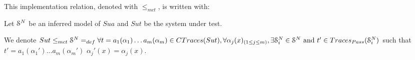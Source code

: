 %
%

This implementation relation, denoted with $\leq_{mct}$, is
written with:

\begin{definition}
	\label{impl21}
	 Let $\EuScript{S}^{N}$ be an inferred model of $\mathit{Sua}$ and
	 $\mathit{Sut}$ be the system under test.

     We denote ${Sut} \leq_{mct} \EuScript{S}^{N} =_{def} \forall
     t= a_1(\alpha_1) \dots a_m(\alpha_m) \in CTraces({Sut}),
     \forall \alpha_j(x)_{(1 \leq j \leq m)},\\ \exists
     \EuScript{S}_i^{N} \in \EuScript{S}^{N} \text{ and } t'\in
     Traces_{Pass}(\EuScript{S}_i^{N})$ such that
     $t'=a_1(\alpha_1')...a_m(\alpha_m')$ 
     $\alpha_j'(x)=\alpha_j(x)$.
\end{definition}

